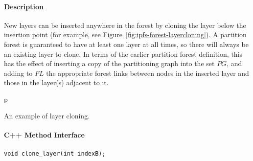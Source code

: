 \paragraph{Description}

New layers can be inserted anywhere in the forest by cloning the layer below the insertion point (for example, see Figure~\ref{fig:ipfs-forest-layercloning}). A partition forest is guaranteed to have at least one layer at all times, so there will always be an existing layer to clone. In terms of the earlier partition forest definition, this has the effect of inserting a copy of the partitioning graph into the set $\textit{PG}$, and adding to $\textit{FL}$ the appropriate forest links between nodes in the inserted layer and those in the layer(s) adjacent to it.

\begin{stusubfig}{p}
	\hspace{8mm}%
\caption{An example of layer cloning.}
\label{fig:ipfs-forest-layercloning}
\end{stusubfig}

\paragraph{C++ Method Interface}

\begin{lstlisting}[style=Prototype]
void clone_layer(int indexB);
\end{lstlisting}


